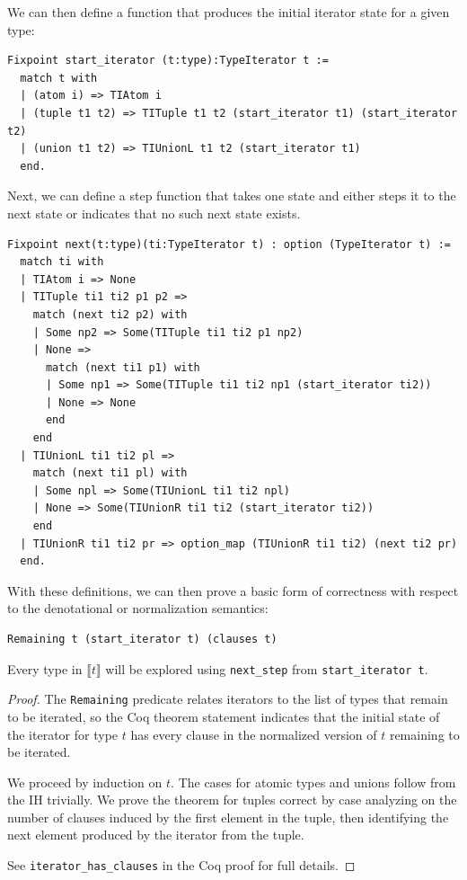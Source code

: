 \documentclass[a4paper,english]{lipics-v2019}
\newcommand{\denotes}[1]{\llbracket #1 \rrbracket}
\begin{document}
\noindent We can then define a function that produces the initial iterator state for a
given type:

\begin{small}
\begin{verbatim}
Fixpoint start_iterator (t:type):TypeIterator t :=
  match t with
  | (atom i) => TIAtom i
  | (tuple t1 t2) => TITuple t1 t2 (start_iterator t1) (start_iterator t2)
  | (union t1 t2) => TIUnionL t1 t2 (start_iterator t1)
  end.
\end{verbatim}
\end{small}

\noindent Next, we can define a step function that takes one state and either steps it
to the next state or indicates that no such next state exists.

\begin{small}\begin{verbatim}
Fixpoint next(t:type)(ti:TypeIterator t) : option (TypeIterator t) :=
  match ti with
  | TIAtom i => None
  | TITuple ti1 ti2 p1 p2 =>
    match (next ti2 p2) with
    | Some np2 => Some(TITuple ti1 ti2 p1 np2)
    | None =>
      match (next ti1 p1) with
      | Some np1 => Some(TITuple ti1 ti2 np1 (start_iterator ti2))
      | None => None
      end
    end
  | TIUnionL ti1 ti2 pl =>
    match (next ti1 pl) with
    | Some npl => Some(TIUnionL ti1 ti2 npl)
    | None => Some(TIUnionR ti1 ti2 (start_iterator ti2))
    end
  | TIUnionR ti1 ti2 pr => option_map (TIUnionR ti1 ti2) (next ti2 pr)
  end.
\end{verbatim}\end{small}

With these definitions, we can then prove a basic form of correctness with
respect to the denotational or normalization semantics:

\begin{theorem}\begin{verbatim}
Remaining t (start_iterator t) (clauses t)
\end{verbatim}
Every type in $\denotes{t}$ will be explored using \verb|next_step| from \verb|start_iterator t|. 
\end{theorem}
\begin{proof}
The \verb|Remaining| predicate relates iterators to the list of types that remain to be iterated, so
the Coq theorem statement indicates that the initial state of the iterator for type $t$ has every clause
in the normalized version of $t$ remaining to be iterated.

We proceed by induction on $t$. The cases for atomic types and unions follow
from the IH trivially. We prove the theorem for tuples correct by case analyzing
on the number of clauses induced by the first element in the tuple, then identifying
the next element produced by the iterator from the tuple.

See \verb|iterator_has_clauses| in the Coq proof for full details.
\end{proof}
\end{document}
